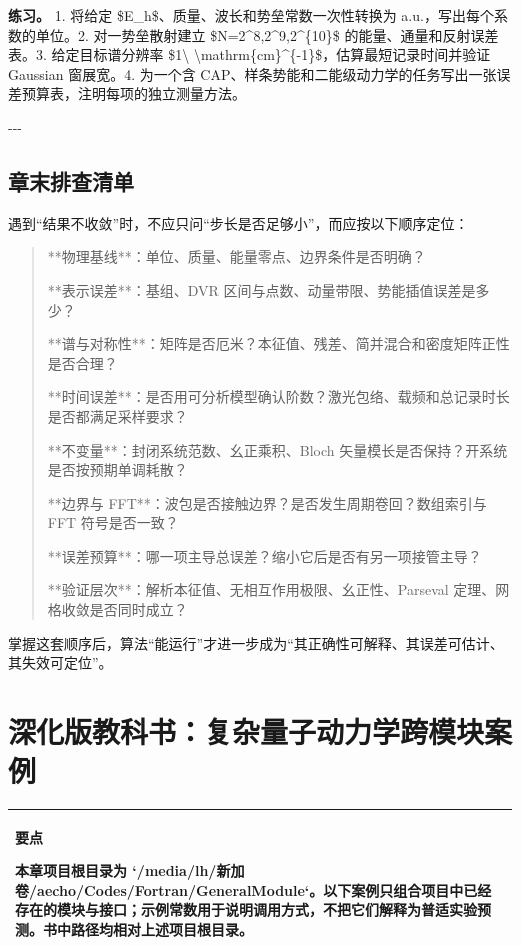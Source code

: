 \documentclass[UTF8,openany,11pt,fontset=fandol]{ctexbook}
\begin{document}
\textbf{练习。} 1. 将给定 \$E\_h\$、质量、波长和势垒常数一次性转换为
a.u.，写出每个系数的单位。2. 对一势垒散射建立
\$N=2\^{}8,2\^{}9,2\^{}\{10\}\$ 的能量、通量和反射误差表。3.
给定目标谱分辨率 \$1\textbackslash{}
\textbackslash mathrm\{cm\}\^{}\{-1\}\$，估算最短记录时间并验证 Gaussian
窗展宽。4. 为一个含
CAP、样条势能和二能级动力学的任务写出一张误差预算表，注明每项的独立测量方法。

-\/-\/-

\section{\texorpdfstring{\textbf{章末排查清单}}{章末排查清单}}\label{ux7ae0ux672bux6392ux67e5ux6e05ux5355}

遇到``结果不收敛''时，不应只问``步长是否足够小''，而应按以下顺序定位：

\begin{quote}
**物理基线**：单位、质量、能量零点、边界条件是否明确？

**表示误差**：基组、DVR 区间与点数、动量带限、势能插值误差是多少？

**谱与对称性**：矩阵是否厄米？本征值、残差、简并混合和密度矩阵正性是否合理？

**时间误差**：是否用可分析模型确认阶数？激光包络、载频和总记录时长是否都满足采样要求？

**不变量**：封闭系统范数、幺正乘积、Bloch
矢量模长是否保持？开系统是否按预期单调耗散？

**边界与 FFT**：波包是否接触边界？是否发生周期卷回？数组索引与 FFT
符号是否一致？

**误差预算**：哪一项主导总误差？缩小它后是否有另一项接管主导？

**验证层次**：解析本征值、无相互作用极限、幺正性、Parseval
定理、网格收敛是否同时成立？
\end{quote}

掌握这套顺序后，算法``能运行''才进一步成为``其正确性可解释、其误差可估计、其失效可定位''。

\chapter{深化版教科书：复杂量子动力学跨模块案例}\label{ux6df1ux5316ux7248ux6559ux79d1ux4e66ux590dux6742ux91cfux5b50ux52a8ux529bux5b66ux8de8ux6a21ux5757ux6848ux4f8b}

\begin{longtable}[]{@{}l@{}}
\toprule
\endhead
\begin{minipage}[t]{0.97\columnwidth}\raggedright
\textbf{要点}

本章项目根目录为
`/media/lh/新加卷/aecho/Codes/Fortran/GeneralModule`。以下案例只组合项目中已经存在的模块与接口；示例常数用于说明调用方式，不把它们解释为普适实验预测。书中路径均相对上述项目根目录。\strut
\end{minipage}\tabularnewline
\bottomrule
\end{longtable}
\end{document}

